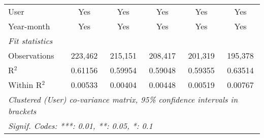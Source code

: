 \begin{table}[htbp]
\begin{threeparttable}[b]
\begin{tabular}{lccccc}
         User                         & Yes              & Yes              & Yes              & Yes              & Yes\\  
         Year-month                   & Yes              & Yes              & Yes              & Yes              & Yes\\  
         \midrule
         \emph{Fit statistics}\\
         Observations                 & 223,462          & 215,151          & 208,417          & 201,319          & 195,378\\  
         R$^2$                        & 0.61156          & 0.59954          & 0.59048          & 0.59355          & 0.63514\\  
         Within R$^2$                 & 0.00533          & 0.00404          & 0.00448          & 0.00519          & 0.00767\\  
         \midrule \midrule
         \multicolumn{6}{l}{\emph{Clustered (User) co-variance matrix, 95\% confidence intervals in brackets}}\\
         \multicolumn{6}{l}{\emph{Signif. Codes: ***: 0.01, **: 0.05, *: 0.1}}\\
      \end{tabular}
   \end{threeparttable}
\end{table}


